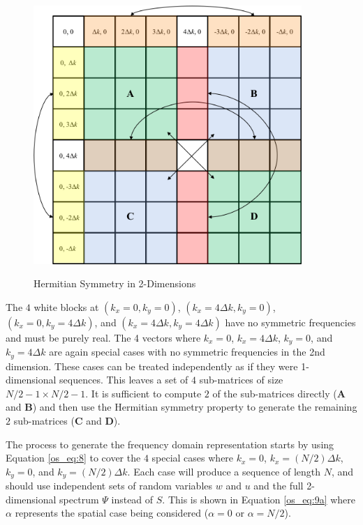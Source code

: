 \begin{figure}[ht]
  \begin{center}
\includegraphics[width=4in]{../media/Ocean_Surface/2-d_hermitian_symmetry.png}
  \end{center}
  \renewcommand{\baselinestretch}{1} \small\normalsize
  \begin{quote}
    \caption[Hermitian Symmetry in 2-Dimensions]{Hermitian Symmetry in 2-Dimensions \label{os_fig:7dd}}
  \end{quote}
\end{figure}
\renewcommand{\baselinestretch}{2} \small\normalsize

The $4$ white blocks at $(k_x=0, k_y=0)$, $(k_x=4\Delta k, k_y=0)$, $(k_x=0, k_y=4\Delta k)$, and $(k_x=4\Delta k, k_y=4\Delta k)$ have no symmetric frequencies and must be purely real. The 4 vectors where $k_x = 0$, $k_x = 4\Delta k$, $k_y = 0$, and $k_y = 4\Delta k$ are again special cases with no symmetric frequencies in the 2nd dimension. These cases can be treated independently as if they were 1-dimensional sequences. This leaves a set of $4$ sub-matrices of size $N/2 - 1 \times N/2 - 1$. It is sufficient to compute $2$ of the sub-matrices directly ($\mathbf{A}$ and $\mathbf{B}$) and then use the Hermitian symmetry property to generate the remaining $2$ sub-matrices ($\mathbf{C}$ and $\mathbf{D}$).

The process to generate the frequency domain representation starts by using Equation \ref{os_eq:8} to cover the $4$ special cases where $k_x = 0$, $k_x = (N/2)\Delta k$, $k_y = 0$, and $k_y = (N/2)\Delta k$. Each case will produce a sequence of length $N$, and should use independent sets of random variables $w$ and $u$ and the full 2-dimensional spectrum $\Psi$ instead of $S$. This is shown in Equation \ref{os_eq:9a} where $\alpha$ represents the spatial case being considered ($\alpha = 0$ or $\alpha = N/2$).

